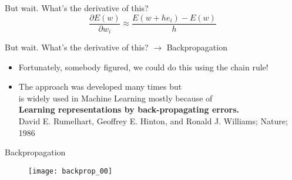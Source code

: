 \begin{frame}{But wait. What's the derivative of this?}
  \begin{equation*}
    \frac{\partial E(w)}{\partial w_{i}} \approx \frac{E(w+he_{i})-E(w)}{h}
  \end{equation*}
\end{frame}


\begin{frame}{But wait. What's the derivative of this? $\rightarrow$ Backpropagation}
    \begin{itemize}
      \item Fortunately, somebody figured, we could do this using the chain rule!
      \item The approach was developed many times but \\
            is widely used in Machine Learning mostly because of \\
            \textbf{Learning representations by back-propagating errors.} \\
            David E. Rumelhart, Geoffrey E. Hinton, and Ronald J. Williams; Nature; 1986
    \end{itemize}

  \note{
    \begin{itemize}
      \item
      \item
    \end{itemize}
  }
\end{frame}


\begin{frame}{Backpropagation}
  \begin{figure}
    \texttt{[image: backprop\_00]}
  \end{figure}
\end{frame}


